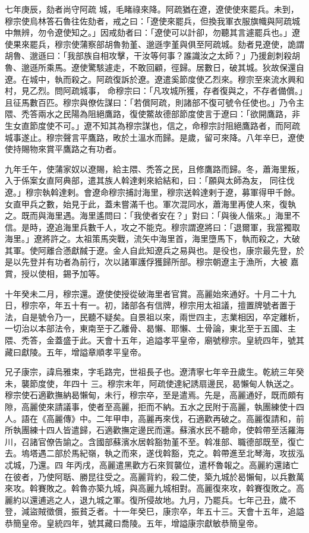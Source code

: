 \begin{pinyinscope}
 七年庚辰，劾者尚守阿疏
 城，毛睹祿來降。阿疏猶在遼，遼使使來罷兵。未到，穆宗使烏林答石魯往佐劾者，戒之曰：「遼使來罷兵，但換我軍衣服旗幟與阿疏城中無辨，勿令遼使知之。」因戒劾者曰：「遼使可以計卻，勿聽其言遽罷兵也。」遼使果來罷兵，穆宗使蒲察部胡魯勃堇、邈遜孛堇與俱至阿疏城。劾者見遼使，詭謂胡魯、邈遜曰：「我部族自相攻擊，干汝等何事？誰識汝之太師？」乃援創刺殺胡魯、邈遜所乘馬。遼使驚駭遽走，不敢回顧，徑歸。居數日，破其城。狄故保還自遼。在城中，執而殺之。阿疏復訴於遼。遼遣奚節度使乙烈來。穆宗至來流水興和村，見乙烈。問阿疏城事，
 命穆宗曰：「凡攻城所獲，存者復與之，不存者備償。」且征馬數百匹。穆宗與僚佐謀曰：「若償阿疏，則諸部不復可號令任使也。」乃令主隈、禿答兩水之民陽為阻絕鷹路，復使鱉故德部節度使言于遼曰：「欲開鷹路，非生女直節度使不可。」遼不知其為穆宗謀也，信之，命穆宗討阻絕鷹路者，而阿疏城事遂止。穆宗聲言平鷹路，畋於土溫水而歸。是歲，留可來降。八年辛巳，遼使使持賜物來賞平鷹路之有功者。



 九年壬午，使蒲家奴以遼賜，給主隈、禿答之民，且修鷹路而歸。冬，蕭海里叛，入于係案女直阿典部，遣其族人斡達剌來給結和，曰：「願與太師為友，
 同往伐遼。」穆宗執斡達剌。會遼命穆宗捕討海里，穆宗送斡達剌于遼，募軍得甲千餘。女直甲兵之數，始見于此，蓋未嘗滿千也。軍次混同水，蕭海里再使人來，復執之。既而與海里遇。海里遙問曰：「我使者安在？」對曰：「與後人偕來。」海里不信。是時，遼追海里兵數千人，攻之不能克。穆宗謂遼將曰：「退爾軍，我當獨取海里。」遼將許之。太祖策馬突戰，流矢中海里首，海里墮馬下，執而殺之，大破其軍。使阿離合懣獻馘于遼。金人自此知遼兵之易與也。是役也，康宗最先登，於是以先登并有功者為前行，次以諸軍護俘獲歸所部。穆宗朝遼主于漁所，大被
 嘉賞，授以使相，錫予加等。



 十年癸未二月，穆宗還。遼使使授從破海里者官賞。高麗始來通好。十月二十九日，穆宗卒，年五十有一。初，諸部各有信牌，穆宗用太祖議，擅置牌號者置于法，自是號令乃一，民聽不疑矣。自景祖以來，兩世四主，志業相因，卒定離析，一切治以本部法令，東南至于乙離骨、曷懶、耶懶、土骨論，東北至于五國、主隈、禿答，金蓋盛于此。天會十五年，追謚孝平皇帝，廟號穆宗。皇統四年，號其藏曰獻陵。五年，增謚章順孝平皇帝。



 兄子康宗，諱烏雅束，字毛路完，世祖長子也。遼清寧七年辛丑歲生。乾統三年癸未，襲節度使，年四十
 三。穆宗末年，阿疏使達紀誘扇邊民，曷懶甸人執送之。穆宗使石適歡撫納曷懶甸，未行，穆宗卒，至是遣焉。先是，高麗通好，既而頗有隙，高麗使來請議事，使者至高麗，拒而不納。五水之民附于高麗，執團練使十四人。語在《高麗傳》中。二年甲申，高麗再來伐，石適歡再破之。高麗復請和，前所執團練十四人皆遣歸，石適歡撫定邊民而還。蘇濱水民不聽命，使斡帶至活羅海川，召諸官僚告諭之。含國部蘇濱水居斡豁勃堇不至。斡准部、職德部既至，復亡去。塢塔遇二部於馬紀嶺，執之而來，遂伐斡豁，克之。斡帶進至北琴海，攻拔泓忒城，乃還。四
 年丙戌，高麗遣黑歡方石來賀襲位，遣杯魯報之。高麗約還諸亡在彼者，乃使阿聒、勝昆往受之。高麗背約，殺二使，築九城於曷懶甸，以兵數萬來攻。斡賽敗之。斡魯亦築九城，與高麗九城相對。高麗復來攻，斡賽復敗之。高麗約以還逋逃之人，退九城之軍。復所侵故地。九月，乃罷兵。七年己丑，歲不登，減盜賊徵償，振貧乏者。十一年癸巳，康宗卒，年五十三。天會十五年，追謚恭簡皇帝。皇統四年，號其藏曰喬陵。五年，增謚康宗獻敏恭簡皇帝。




\end{pinyinscope}
